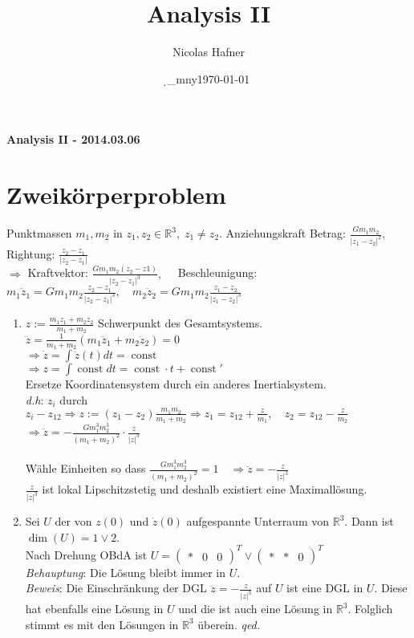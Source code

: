 \documentclass[12pt,a4paper,titlepage]{article}
\author{Nicolas Hafner}
\title{Analysis II}
\date{\d_mny\today}
\newcommand{\const}{\operatorname{const}}
\newcommand{\setR}{\mathbb{R}}
\begin{document}
	
\begin{center}{\bfseries\Huge Analysis II - 2014.03.06}\end{center}
\section*{Zweikörperproblem}
Punktmassen $m_1,m_2$ in $z_1,z_2\in\setR^3,\; z_1\neq z_2$. Anziehungskraft Betrag: $\frac{Gm_1m_2}{|z_1-z_2|^2}$, Rightung: $\frac{z_2-z_1}{|z_2-z_1|}$ \\
$\Rightarrow$ Kraftvektor: $\frac{Gm_1m_2(z_2-z1)}{|z_2-z_1|^3},\quad$ Beschleunigung: $m_1\ddot z_1=Gm_1m_2\frac{z_2-z_1}{|z_2-z_1|^3},\quad m_2\ddot z_2=Gm_1m_2\frac{z_1-z_2}{|z_1-z_2|^3}$ \\
\begin{enumerate}[label=(\arabic*)]
\item $z:=\frac{m_1z_1+m_2z_2}{m_1+m_2}$ Schwerpunkt des Gesamtsystems. \\
  $\ddot z=\frac{1}{m_1+m_2}(m_1\ddot z_1+m_2\ddot z_2)=0$ \\
  $\Rightarrow \dot z = \int\ddot z(t)dt = \const$ \\
  $\Rightarrow z=\int \const dt= \const\cdot t+\const'$ \\
  Ersetze Koordinatensystem durch ein anderes Inertialsystem. \\
  \textit{d.h}: $z_i$ durch $z_i-z_{12} \Rightarrow z:=(z_1-z_2)\frac{m_1m_2}{m_1+m_2} \Rightarrow z_1=z_{12}+\frac{z}{m_1},\quad z_2=z_{12}-\frac{z}{m_2}$ \\
  $\Rightarrow \ddot z=-\frac{Gm_1^3m_2^3}{(m_1+m_2)^2}\cdot\frac{z}{|z|^3}$ \\
  \\
  Wähle Einheiten so dass $\frac{Gm_1^3m_2^3}{(m_1+m_2)^2}=1 \quad\Rightarrow \ddot z=-\frac{z}{|z|^3}$ \\
  $\frac{z}{|z|^3}$ ist lokal Lipschitzstetig und deshalb existiert eine Maximallösung.

\item Sei $U$ der von $z(0)$ und $\dot z(0)$ aufgespannte Unterraum von $\setR^3$. Dann ist $\dim(U)=1\lor 2$. \\
  Nach Drehung OBdA ist $U=\begin{pmatrix}* & 0 & 0\end{pmatrix}^T \lor \begin{pmatrix}* & * & 0 \end{pmatrix}^T$ \\
  \textit{Behauptung}: Die Lösung bleibt immer in $U$. \\
  \textit{Beweis}: Die Einschränkung der DGL $\ddot z=-\frac{z}{|z|^3}$ auf $U$ ist eine DGL in $U$. Diese hat ebenfalls eine Lösung in $U$ und die ist auch eine Lösung in $\setR^3$. Folglich stimmt es mit den Lösungen in $\setR^3$ überein. \emph{qed.}


\end{enumerate}
\end{document}

